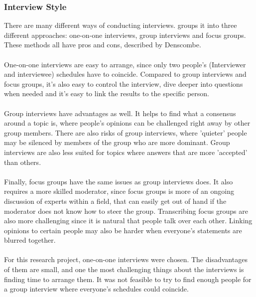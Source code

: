 \documentclass{cslthse-msc}
\begin{document}
    \subsubsection{Interview Style}
    There are many different ways of conducting interviews. \citet{denscombe} groups it into
    three different approaches: one-on-one interviews, group interviews and focus groups.
    These methods all have pros and cons, described by Denscombe.
    \\ \\
    One-on-one interviews are easy to arrange, since
    only two people's (Interviewer and interviewee) schedules have to coincide.
    Compared to group interviews and focus groups, it's also easy to control the interview,
    dive deeper into questions when needed and it's easy to link the results
    to the specific person.
    \\ \\
    Group interviews have advantages as well. It helps to find what a consensus around
    a topic is, where people's opinions can be challenged right away by other group members.
    There are also risks of group interviews, where 'quieter' people may be silenced by
    members of the group who are more dominant. Group interviews are also less suited
    for topics where answers that are more 'accepted' than others.
    \\ \\
    Finally, focus groups have the same issues as group interviews does. It also
    requires a more skilled moderator, since focus groups is more of an ongoing
    discussion of experts within a field, that can easily get out of hand if the
    moderator does not know how to steer the group.  Transcribing focus groups are also
    more challenging since it is natural that people talk over each other. Linking opinions
    to certain people may also be harder when everyone's statements are blurred together.
    \\ \\
    For this research project, one-on-one interviews were chosen.
    The disadvantages of them are small, and one the most challenging things
    about the interviews is finding time to arrange them. It was not feasible
    to try to find enough people for a group interview where everyone's schedules
    could coincide.
\end{document}

